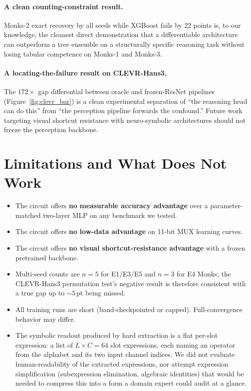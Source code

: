\documentclass{article}
\begin{document}
\paragraph{A clean counting-constraint result.}
Monks-2 exact recovery by all seeds while XGBoost fails by 22 points is, to our knowledge, the cleanest direct demonstration that a differentiable architecture can outperform a tree ensemble on a structurally specific reasoning task without losing tabular competence on Monks-1 and Monks-3.

\paragraph{A locating-the-failure result on CLEVR-Hans3.}
The $172\times$ gap differential between oracle and frozen-ResNet pipelines (Figure~\ref{fig:clevr_bar}) is a clean experimental separation of ``the reasoning head can do this'' from ``the perception pipeline forwards the confound.''
Future work targeting visual shortcut resistance with neuro-symbolic architectures should not freeze the perception backbone.

\section{Limitations and What Does Not Work}
\label{sec:limitations}

\begin{itemize}
  \item The circuit offers \textbf{no measurable accuracy advantage} over a parameter-matched two-layer MLP on any benchmark we tested.
  \item The circuit offers \textbf{no low-data advantage} on 11-bit MUX learning curves.
  \item The circuit offers \textbf{no visual shortcut-resistance advantage} with a frozen pretrained backbone.
  \item Multi-seed counts are $n{=}5$ for E1/E3/E5 and $n{=}3$ for E4 Monks; the CLEVR-Hans3 permutation test's negative result is therefore consistent with a true gap up to ${\sim}5$\,pt being missed.
  \item All training runs are short (band-checkpointed or capped). Full-convergence behavior may differ.
  \item The symbolic readout produced by hard extraction is a flat per-slot expression: a list of $L \times C = 64$ slot expressions, each naming an operator from the alphabet and its two input channel indices. We did not evaluate human-readability of the extracted expressions, nor attempt expression simplification (subexpression elimination, algebraic identities) that would be needed to compress this into a form a domain expert could audit at a glance.
\end{itemize}
\end{document}
